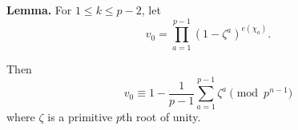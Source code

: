 \textbf{Lemma.} For $1 \leq k \leq p-2$, let
$$v_0 = \prod_{a=1}^{p-1} \left(1 - \zeta^{a}\right)^{e(\chi_a)}.$$

Then
$$v_0 \equiv 1 - \frac{1}{p-1} \sum_{a=1}^{p-1} \zeta^{a} \pmod{p^{n-1}}$$
where $\zeta$ is a primitive $p$th root of unity.
